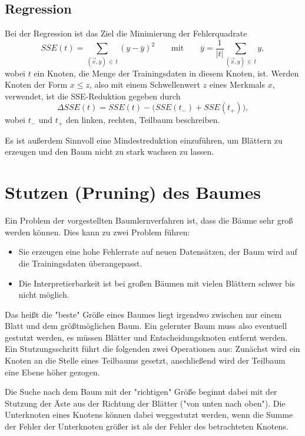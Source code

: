 		\subsection{Regression}
			Bei der Regression ist das Ziel die Minimierung der Fehlerquadrate
			\begin{equation}
				\textit{SSE}(t) = \sum_{(\vec{x}, y) \,\in\, t} (y - \bar{y})^2
				\qquad\text{mit}\qquad
				\bar{y} = \frac{1}{\lvert t \rvert} \sum_{(\vec{x}, y) \,\in\, t} y,
			\end{equation}
			wobei \(t\) ein Knoten, \bzw die Menge der Trainingsdaten in diesem Knoten, ist. Werden Knoten der Form \( x \leq z \), also mit einem Schwellenwert \(z\) \bzgl eines Merkmals \(x\), verwendet, ist die SSE-Reduktion gegeben durch
			\begin{equation}
				\Delta \textit{SSE}(t) = \textit{SSE}(t) - \big( \textit{SSE}(t_-) + \textit{SSE}(t_+) \big),
			\end{equation}
			wobei \(t_-\) und \(t_+\) den linken, \bzw rechten, Teilbaum beschreiben.

			Es ist außerdem Sinnvoll eine Mindestreduktion einzuführen, um Blättern zu erzeugen und den Baum nicht zu stark wachsen zu lassen.

	\section{Stutzen (Pruning) des Baumes}
		Ein Problem der vorgestellten Baumlernverfahren ist, dass die Bäume sehr groß werden können. Dies kann zu zwei Problem führen:
		\begin{itemize}
			\item Sie erzeugen eine hohe Fehlerrate auf neuen Datensätzen, \dh der Baum wird auf die Trainingsdaten überangepasst.
			\item Die Interpretierbarkeit ist bei großen Bäumen mit vielen Blättern schwer bis nicht möglich.
		\end{itemize}
		Das heißt die "beste" Größe eines Baumes liegt irgendwo zwischen nur einem Blatt und dem größtmöglichen Baum. Ein gelernter Baum muss also eventuell gestutzt werden, \dh es müssen Blätter und Entscheidungsknoten entfernt werden. Ein Stutzungsschritt führt die folgenden zwei Operationen aus: Zunächst wird ein Knoten an die Stelle eines Teilbaums gesetzt, anschließend wird der Teilbaum eine Ebene höher gezogen.

		Die Suche nach dem Baum mit der "richtigen" Größe beginnt dabei mit der Stutzung der Äste aus der Richtung der Blätter ("von unten nach oben"). Die Unterknoten eines Knotens können dabei weggestutzt werden, wenn die Summe der Fehler der Unterknoten größer ist als der Fehler des betrachteten Knotens.


